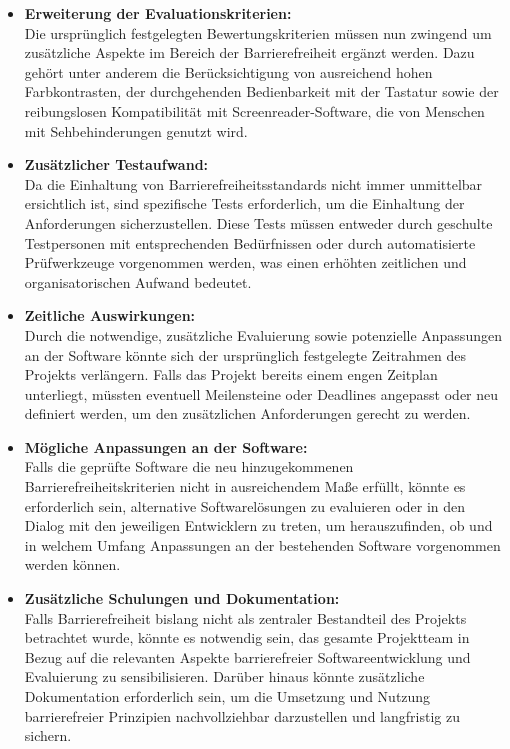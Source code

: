 \documentclass[ThesisDJ.tex]{subfiles}
\begin{document}
\begin{itemize}
    \item \textbf{Erweiterung der Evaluationskriterien:} \\Die ursprünglich festgelegten Bewertungskriterien müssen nun zwingend um zusätzliche Aspekte im Bereich der Barrierefreiheit ergänzt werden. Dazu gehört unter anderem die Berücksichtigung von ausreichend hohen Farbkontrasten, der durchgehenden Bedienbarkeit mit der Tastatur sowie der reibungslosen Kompatibilität mit Screenreader-Software, die von Menschen mit Sehbehinderungen genutzt wird.
    \item \textbf{Zusätzlicher Testaufwand:} \\Da die Einhaltung von Barrierefreiheitsstandards nicht immer unmittelbar ersichtlich ist, sind spezifische Tests erforderlich, um die Einhaltung der Anforderungen sicherzustellen. Diese Tests müssen entweder durch geschulte Testpersonen mit entsprechenden Bedürfnissen oder durch automatisierte Prüfwerkzeuge vorgenommen werden, was einen erhöhten zeitlichen und organisatorischen Aufwand bedeutet. 
    \item \textbf{Zeitliche Auswirkungen:} \\Durch die notwendige, zusätzliche Evaluierung sowie potenzielle Anpassungen an der Software könnte sich der ursprünglich festgelegte Zeitrahmen des Projekts verlängern. Falls das Projekt bereits einem engen Zeitplan unterliegt, müssten eventuell Meilensteine oder Deadlines angepasst oder neu definiert werden, um den zusätzlichen Anforderungen gerecht zu werden.
    \item \textbf{Mögliche Anpassungen an der Software:} \\Falls die geprüfte Software die neu hinzugekommenen Barrierefreiheitskriterien nicht in ausreichendem Maße erfüllt, könnte es erforderlich sein, alternative Softwarelösungen zu evaluieren oder in den Dialog mit den jeweiligen Entwicklern zu treten, um herauszufinden, ob und in welchem Umfang Anpassungen an der bestehenden Software vorgenommen werden können.
    \item \textbf{Zusätzliche Schulungen und Dokumentation:} \\Falls Barrierefreiheit bislang nicht als zentraler Bestandteil des Projekts betrachtet wurde, könnte es notwendig sein, das gesamte Projektteam in Bezug auf die relevanten Aspekte barrierefreier Softwareentwicklung und Evaluierung zu sensibilisieren. Darüber hinaus könnte zusätzliche Dokumentation erforderlich sein, um die Umsetzung und Nutzung barrierefreier Prinzipien nachvollziehbar darzustellen und langfristig zu sichern.
\end{itemize}
\end{document}
